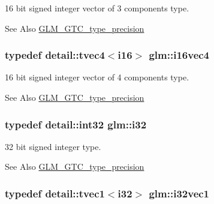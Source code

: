 16 bit signed integer vector of 3 components type. 

\begin{DoxySeeAlso}{See Also}
\hyperlink{group__gtc__type__precision}{G\-L\-M\-\_\-\-G\-T\-C\-\_\-type\-\_\-precision} 
\end{DoxySeeAlso}
\hypertarget{group__gtc__type__precision_gaa5ac58e1f15cc47ae8f11cf9849cd9be}{
\subsubsection[{i16vec4}]{\setlength{\rightskip}{0pt plus 5cm}typedef detail\-::tvec4$<$i16$>$ {\bf glm\-::i16vec4}}}\label{group__gtc__type__precision_gaa5ac58e1f15cc47ae8f11cf9849cd9be}


16 bit signed integer vector of 4 components type. 

\begin{DoxySeeAlso}{See Also}
\hyperlink{group__gtc__type__precision}{G\-L\-M\-\_\-\-G\-T\-C\-\_\-type\-\_\-precision} 
\end{DoxySeeAlso}
\hypertarget{group__gtc__type__precision_ga1d8ed5c43e91ea7d4528389da4fa9524}{
\subsubsection[{i32}]{\setlength{\rightskip}{0pt plus 5cm}typedef detail\-::int32 {\bf glm\-::i32}}}\label{group__gtc__type__precision_ga1d8ed5c43e91ea7d4528389da4fa9524}


32 bit signed integer type. 

\begin{DoxySeeAlso}{See Also}
\hyperlink{group__gtc__type__precision}{G\-L\-M\-\_\-\-G\-T\-C\-\_\-type\-\_\-precision} 
\end{DoxySeeAlso}
\hypertarget{group__gtc__type__precision_gaffde115d86f11a3aa35c294de22eb028}{
\subsubsection[{i32vec1}]{\setlength{\rightskip}{0pt plus 5cm}typedef detail\-::tvec1$<$i32$>$ {\bf glm\-::i32vec1}}}\label{group__gtc__type__precision_gaffde115d86f11a3aa35c294de22eb028}



